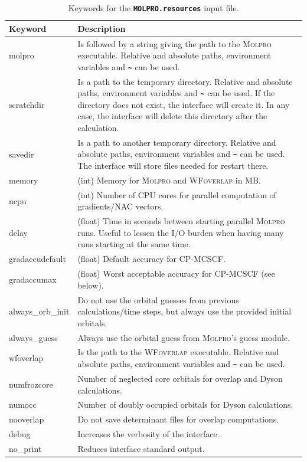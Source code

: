 \documentclass[a4paper,10pt,DIV=15,openany]{scrbook}
\newcommand{\ttt}[1]{\textbf{\texttt{#1}}}
\begin{document}
\begin{table}[t]
  \centering
  \caption{Keywords for the \ttt{MOLPRO.resources} input file.}
  \label{tab:molpro_sh2}
  \begin{tabular}{>{\ttfamily}lp{12cm}}
  \hline
  Keyword       &Description\\
  \hline
  molpro          &Is followed by a string giving the path to the \textsc{Molpro} executable. Relative and absolute paths, environment variables and \ttt{\textasciitilde} can be used. \\
  scratchdir      &Is a path to the temporary directory. Relative and absolute paths, environment variables and \ttt{\textasciitilde} can be used. If the directory does not exist, the interface will create it. In any case, the interface will delete this directory after the calculation.\\
  savedir         &Is a path to another temporary directory.  Relative and absolute paths, environment variables and \ttt{\textasciitilde} can be used. The interface will store files needed for restart there.\\
  memory        &(int) Memory for \textsc{Molpro} and \textsc{WFoverlap} in MB.\\
  ncpu          &(int) Number of CPU cores for parallel computation of gradients/NAC vectors.\\
  delay         &(float) Time in seconds between starting parallel \textsc{Molpro} runs. Useful to lessen the I/O burden when having many runs starting at the same time.\\
  gradaccudefault &(float) Default accuracy for CP-MCSCF.\\
  gradaccumax     &(float) Worst acceptable accuracy for CP-MCSCF (see below).\\
  always\_orb\_init &Do not use the orbital guesses from previous calculations/time steps, but always use the provided initial orbitals.\\
  always\_guess   &Always use the orbital guess from \textsc{Molpro}'s guess module.\\
  wfoverlap       &Is the path to the \textsc{WFoverlap} executable. Relative and absolute paths, environment variables and \ttt{\textasciitilde} can be used.\\
  numfrozcore           &Number of neglected core orbitals for overlap and Dyson calculations.\\
  numocc           &Number of doubly occupied orbitals for Dyson calculations.\\
  nooverlap       &Do not save determinant files for overlap computations.\\
  debug           &Increases the verbosity of the interface.\\
  no\_print       &Reduces interface standard output.\\
  \hline
  \end{tabular}
\end{table}
\end{document}
